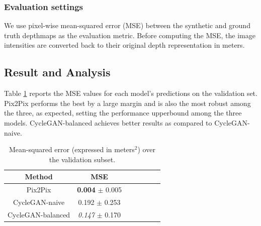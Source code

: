 \subsubsection{Evaluation settings}
We use pixel-wise mean-squared error (MSE) between the synthetic and ground truth depthmaps as the evaluation metric. Before computing the MSE, the image intensities are converted back to their original depth representation in meters.


\subsection{Result and Analysis}
Table \ref{tab:cleargrasp_quant} reports the MSE values for each model's predictions on the validation set. Pix2Pix performs the best by a large margin and is also the most robust among the three, as expected, setting the performance upperbound among the three models. CycleGAN-balanced achieves better results as compared to CycleGAN-naive. 

\begin{table}[h!]
    \small
    \centering
    \begin{tabular}{ccccccc}
        \hline
        \textbf{Method} & \textbf{MSE} \\
        \hline
        Pix2Pix    & \textbf{0.004} $\pm$ 0.005 \\
        CycleGAN-naive    & 0.192 $\pm$ 0.253 \\
        CycleGAN-balanced    & \textit{0.147} $\pm$ 0.170 \\
        \hline
    \end{tabular}
    \caption{Mean-squared error (expressed in meters$^2$) over the validation subset.}
    \label{tab:cleargrasp_quant}
\end{table}

